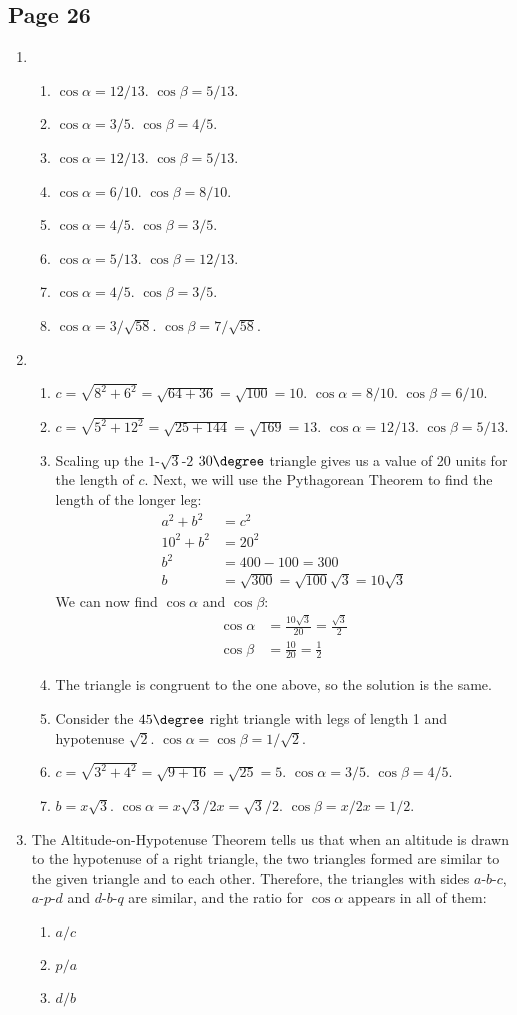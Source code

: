 \documentclass{article}
\newenvironment{solutions}[1]
{\subsection*{#1}
 \begin{enumerate}[leftmargin=1.5em]}
{\end{enumerate}}
\newcommand{\solution}{\item}
\newenvironment{subsolutions}
{\begin{enumerate}}
{\end{enumerate}}
\newcommand{\subsolution}{\item}
\begin{document}
\begin{solutions}{Page 26}
\solution %
\begin{subsolutions}
\subsolution
$\cos{\alpha} = 12/13$.
$\cos{\beta} = 5/13$.
\subsolution
$\cos{\alpha} = 3/5$.
$\cos{\beta} = 4/5$.
\subsolution
$\cos{\alpha} = 12/13$.
$\cos{\beta} = 5/13$.
\subsolution
$\cos{\alpha} = 6/10$.
$\cos{\beta} = 8/10$.
\subsolution
$\cos{\alpha} = 4/5$.
$\cos{\beta} = 3/5$.
\subsolution
$\cos{\alpha} = 5/13$.
$\cos{\beta} = 12/13$.
\subsolution
$\cos{\alpha} = 4/5$.
$\cos{\beta} = 3/5$.
\subsolution
$\cos{\alpha} = 3/\sqrt{58}$.
$\cos{\beta} = 7/\sqrt{58}$.
\end{subsolutions}

\solution %
\begin{subsolutions}
\subsolution
$c = \sqrt{8^2 + 6^2} = \sqrt{64 + 36} = \sqrt{100} = 10$.
$\cos{\alpha} = 8/10$.
$\cos{\beta} = 6/10$.
\subsolution
$c = \sqrt{5^2 + 12^2} = \sqrt{25 + 144} = \sqrt{169} = 13$.
$\cos{\alpha} = 12/13$.
$\cos{\beta} = 5/13$.
\subsolution
Scaling up the $1$-$\sqrt{3}$-$2$ $30\degree$ triangle gives us a value of 20 units for the length of $c$.
Next, we will use the Pythagorean Theorem to find the length of the longer leg:
\begin{align*}
a^2 + b^2 &= c^2\\
10^2 + b^2 &= 20^2\\
b^2 &= 400 - 100 = 300\\
b &= \sqrt{300} = \sqrt{100}\sqrt{3} = 10\sqrt{3}
\end{align*}
We can now find $\cos{\alpha}$ and $\cos{\beta}$:
\begin{align*}
\cos{\alpha} &= \frac{10\sqrt{3}}{20} = \frac{\sqrt{3}}{2}\\
\cos{\beta} &= \frac{10}{20} = \frac{1}{2}
\end{align*}
\subsolution
The triangle is congruent to the one above, so the solution is the same.
\subsolution
Consider the $45\degree$ right triangle with legs of length 1 and hypotenuse $\sqrt{2}$. $\cos{\alpha} = \cos{\beta} = 1/\sqrt{2}$.
\subsolution
$c = \sqrt{3^2 + 4^2} = \sqrt{9 + 16} = \sqrt{25} = 5$.
$\cos{\alpha} = 3/5$. $\cos{\beta} = 4/5$.
\subsolution
$b = x\sqrt{3}$.
$\cos{\alpha} = x\sqrt{3}/2x = \sqrt{3}/2$.
$\cos{\beta} = x/2x = 1/2$.
\end{subsolutions}

\solution %
The Altitude-on-Hypotenuse Theorem tells us that when an altitude is drawn to the hypotenuse of a right triangle, the two triangles formed are similar to the given triangle and to each other. Therefore, the triangles with sides $a$-$b$-$c$, $a$-$p$-$d$ and $d$-$b$-$q$ are similar, and the ratio for $\cos{\alpha}$ appears in all of them:
\begin{subsolutions}
\subsolution $a/c$
\subsolution $p/a$
\subsolution $d/b$
\end{subsolutions}

\end{solutions}
\end{document}
